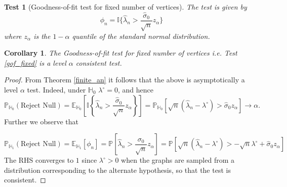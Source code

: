 \documentclass[12pt]{article}
\def\P{\mathbb{P}}
\def\E{\mathbb{E}}
\def\H{\mathbb{H}}
\def\er{ Erd{\"o}s-R{\`e}nyi }
\numberwithin{equation}{section}
\newtheorem{theorem}{Theorem}[section]
\newtheorem{corollary}{Corollary}[section]
\newtheorem{test}{Test}[section]
\begin{document}
\begin{test} [Goodness-of-fit test for fixed number of vertices] The test is given by {\label{gof_fixed}}
\[\phi_{n}=\mathbb{I}\{\hat{\lambda}_n>\frac{\hat{\sigma}_0}{\sqrt{n}}z_{\alpha}\}\]
where $z_{\alpha}$ is the $1-\alpha$ quantile of the standard normal distribution.
\end{test}

\begin{corollary}
 The Goodness-of-fit test for fixed number of vertices i.e. Test \ref{gof_fixed} is a level $\alpha$ consistent test.
\end{corollary}

\begin{proof}
 From Theorem \ref{finite_an} it follows that the above is asymptotically a level $\alpha$ test.
Indeed, under $\H_0$ $\lambda^{\circ}=0$, and hence
$$\P_{\H_0}(\text{Reject Null})=\E_{\H_0}\left[\mathbb{I}\left\{\hat{\lambda}_n>\frac{\hat{\sigma}_0}{\sqrt{n}}z_{\alpha}\right\}\right]=\P_{\H_0}[\sqrt{n}(\hat{\lambda}_n-\lambda^{\circ})>\hat{\sigma}_0z_{\alpha}]\rightarrow \alpha.$$
Further we observe that

\[\P_{\H_1}(\text{Reject Null})=\E_{\H_1}[\phi_n]=\P[\hat{\lambda}_n>\frac{\sigma_0}{\sqrt{n}}z_{\alpha}]=\P[\sqrt{n}(\hat{\lambda}_n-\lambda^{\circ})>-\sqrt{n}\lambda^{\circ}+\hat{\sigma}_0z_{\alpha}]\]
The RHS converges to $1$ since $\lambda^{\circ}>0$ when the graphs are sampled from a distribution corresponding to the alternate hypothesis, so that the test is consistent.

\end{proof}



\end{document}
